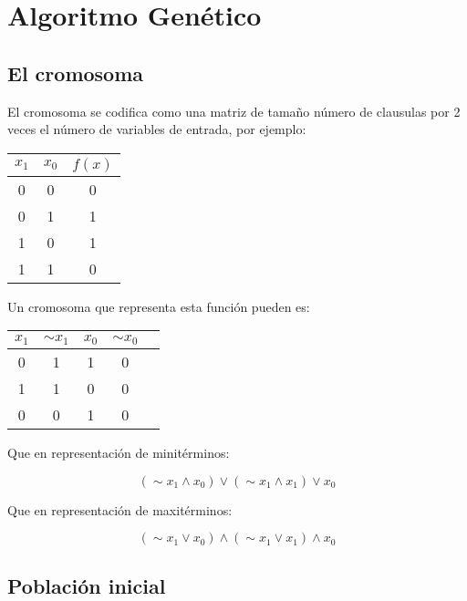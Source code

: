 \documentclass[a4paper]{article}
\begin{document}
\section{Algoritmo Genético}

\subsection{El cromosoma}

El cromosoma se codifica como una matriz de tamaño número de clausulas por 2 veces el número de variables de entrada, por ejemplo:

\begin{table}[H]
	\centering
	\begin{tabular}{|c | c | c|}
		\hline
		$x_1$ & $x_0$ & $f(x)$ \\
		\hline
		0 & 0& 0\\
		\hline
		0 & 1 & 1\\
		\hline
		1 & 0& 1\\
		\hline
		1 & 1 & 0\\
		\hline
	\end{tabular}
\end{table}

Un cromosoma que representa esta función pueden es:

\begin{table}[H]
	\centering
	\begin{tabular}{|c | c | c|  c|  c|}
		\hline
		$x_1$ & $ \sim{x_1}$ & $x_0$ & $ \sim{x_0}$\\
		\hline
		0 & 1& 1 & 0\\
		\hline
		1 & 1& 0 & 0\\
		\hline
		0 & 0& 1 & 0\\
		\hline
	\end{tabular}
\end{table}

Que en representación de minitérminos:

\begin{equation}
	(\sim{x_1} \wedge x_0) \vee (\sim{x_1} \wedge x_1) \vee x_0
\end{equation}

Que en representación de maxitérminos:

\begin{equation}
	(\sim{x_1} \vee x_0) \wedge (\sim{x_1} \vee x_1) \wedge x_0
\end{equation}

\subsection{Población inicial}
\end{document}
